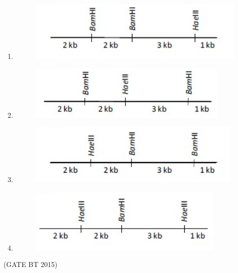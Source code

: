 \documentclass[journal,12pt,onecolumn]{IEEEtran}
\begin{document}
\begin{enumerate}[label=\textbf{Q.\arabic*}]
\begin{multicols}{2}
\begin{enumerate}
\item \begin{figure}[H]
    \centering
    \includegraphics[width=0.7\columnwidth]{fig 9.png}
    \caption{}
    \label{fig9}
\end{figure}
\item \begin{figure}[H]
    \centering
    \includegraphics[width=0.7\columnwidth]{fig 10.png}
    \caption{}
    \label{fig10}
\end{figure}
\item \begin{figure}[H]
    \centering
    \includegraphics[width=0.7\columnwidth]{fig 11.png}
    \caption{}
    \label{fig:Q65}
\end{figure}
\item \begin{figure}[H]
    \centering
    \includegraphics[width=0.7\columnwidth]{fig 12.png}
    \caption{}
    \label{fig:Q65}
\end{figure}
\end{enumerate}
\end{multicols}\hfill (GATE BT 2015)

\end{enumerate}
\end{document}
